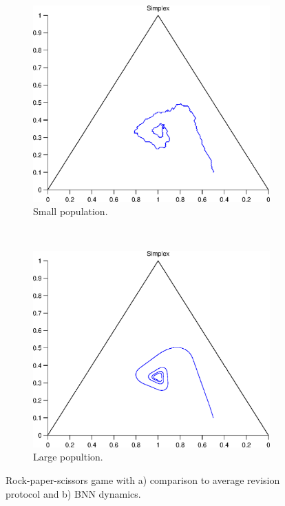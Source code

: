 \begin{figure}[th]
  \centering
  \begin{subfigure}[b]{0.4\textwidth}
	  \includegraphics[width=\textwidth]{./images/test_finite_comparison2average.eps}
	  \caption{Small population.}
	  \label{fig:finite2_protocol}
  \end{subfigure}
  ~ 
  \begin{subfigure}[b]{0.4\textwidth}
	  \includegraphics[width=\textwidth]{./images/test1_simplex_bnn.eps}
	  \caption{Large popultion.}
	  \label{fig:finite2_dynamics}
  \end{subfigure}
  \caption{Rock-paper-scissors game with a) comparison to average revision protocol and b) BNN dynamics.}
  \label{fig:finite2}
\end{figure}


